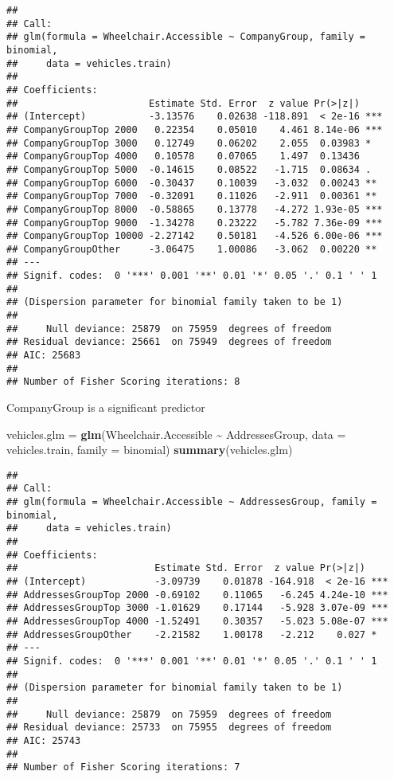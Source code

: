 \documentclass[
]{article}
\newenvironment{Shaded}{\begin{snugshade}}{\end{snugshade}}
\newcommand{\AttributeTok}[1]{\textcolor[rgb]{0.13,0.29,0.53}{#1}}
\newcommand{\FunctionTok}[1]{\textcolor[rgb]{0.13,0.29,0.53}{\textbf{#1}}}
\newcommand{\NormalTok}[1]{#1}
\newcommand{\OtherTok}[1]{\textcolor[rgb]{0.56,0.35,0.01}{#1}}
\newcommand{\SpecialCharTok}[1]{\textcolor[rgb]{0.81,0.36,0.00}{\textbf{#1}}}
\begin{document}
\begin{verbatim}
## 
## Call:
## glm(formula = Wheelchair.Accessible ~ CompanyGroup, family = binomial, 
##     data = vehicles.train)
## 
## Coefficients:
##                       Estimate Std. Error  z value Pr(>|z|)    
## (Intercept)           -3.13576    0.02638 -118.891  < 2e-16 ***
## CompanyGroupTop 2000   0.22354    0.05010    4.461 8.14e-06 ***
## CompanyGroupTop 3000   0.12749    0.06202    2.055  0.03983 *  
## CompanyGroupTop 4000   0.10578    0.07065    1.497  0.13436    
## CompanyGroupTop 5000  -0.14615    0.08522   -1.715  0.08634 .  
## CompanyGroupTop 6000  -0.30437    0.10039   -3.032  0.00243 ** 
## CompanyGroupTop 7000  -0.32091    0.11026   -2.911  0.00361 ** 
## CompanyGroupTop 8000  -0.58865    0.13778   -4.272 1.93e-05 ***
## CompanyGroupTop 9000  -1.34278    0.23222   -5.782 7.36e-09 ***
## CompanyGroupTop 10000 -2.27142    0.50181   -4.526 6.00e-06 ***
## CompanyGroupOther     -3.06475    1.00086   -3.062  0.00220 ** 
## ---
## Signif. codes:  0 '***' 0.001 '**' 0.01 '*' 0.05 '.' 0.1 ' ' 1
## 
## (Dispersion parameter for binomial family taken to be 1)
## 
##     Null deviance: 25879  on 75959  degrees of freedom
## Residual deviance: 25661  on 75949  degrees of freedom
## AIC: 25683
## 
## Number of Fisher Scoring iterations: 8
\end{verbatim}

CompanyGroup is a significant predictor

\begin{Shaded}
\begin{Highlighting}[]
\NormalTok{vehicles.glm }\OtherTok{=} \FunctionTok{glm}\NormalTok{(Wheelchair.Accessible }\SpecialCharTok{\textasciitilde{}}\NormalTok{ AddressesGroup, }\AttributeTok{data =}\NormalTok{ vehicles.train, }
                   \AttributeTok{family =}\NormalTok{ binomial)}
\FunctionTok{summary}\NormalTok{(vehicles.glm)}
\end{Highlighting}
\end{Shaded}

\begin{verbatim}
## 
## Call:
## glm(formula = Wheelchair.Accessible ~ AddressesGroup, family = binomial, 
##     data = vehicles.train)
## 
## Coefficients:
##                        Estimate Std. Error  z value Pr(>|z|)    
## (Intercept)            -3.09739    0.01878 -164.918  < 2e-16 ***
## AddressesGroupTop 2000 -0.69102    0.11065   -6.245 4.24e-10 ***
## AddressesGroupTop 3000 -1.01629    0.17144   -5.928 3.07e-09 ***
## AddressesGroupTop 4000 -1.52491    0.30357   -5.023 5.08e-07 ***
## AddressesGroupOther    -2.21582    1.00178   -2.212    0.027 *  
## ---
## Signif. codes:  0 '***' 0.001 '**' 0.01 '*' 0.05 '.' 0.1 ' ' 1
## 
## (Dispersion parameter for binomial family taken to be 1)
## 
##     Null deviance: 25879  on 75959  degrees of freedom
## Residual deviance: 25733  on 75955  degrees of freedom
## AIC: 25743
## 
## Number of Fisher Scoring iterations: 7
\end{verbatim}
\end{document}
